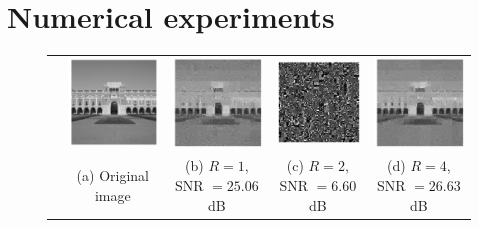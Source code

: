\section{Numerical experiments}
\label{sec:exp}
\begin{figure}[t!]
	\begin{center}
		\setlength{\tabcolsep}{1pt}
		\begin{tabular}{ccccc}
			\rotatebox{90}{$~~~~~~~m=4000$} &
			\includegraphics[width=0.22\linewidth]{./fig/lovett_original.pdf} &
			\includegraphics[width=0.22\linewidth]{./fig/lovett_r1_m_4000_s_800.pdf} & 
			\includegraphics[width=0.22\linewidth]{./fig/lovett_r2_m_4000_s_800.pdf} &
			\includegraphics[width=0.22\linewidth]{./fig/lovett_r4_m_4000_s_800.pdf}  \\
			& \small{(a) Original image}& \small{(b) $R=1$, SNR $=25.06$dB}& \small{(c) $R=2$, SNR $=6.60$dB}& \small{(d) $R=4$, SNR $=26.63$dB} \\
			

\end{tabular}
\end{center}
\end{figure}
